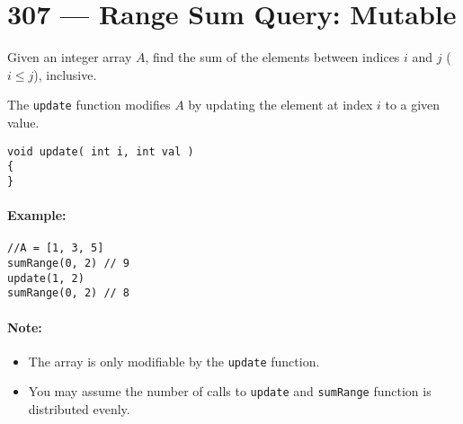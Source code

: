 \section{307 --- Range Sum Query: Mutable}
Given an integer array $A$, find the sum of the elements between indices $i$ and $j$ ($i \leq j$), inclusive.
\par
The \texttt{update} function modifies $A$ by updating the element at index $i$ to a given value.
\begin{lstlisting}[style=customc]
void update( int i, int val )
{
}
\end{lstlisting}

\paragraph{Example:}

\begin{lstlisting}[style=customc]
//A = [1, 3, 5]
sumRange(0, 2) // 9
update(1, 2)
sumRange(0, 2) // 8
\end{lstlisting}

\paragraph{Note:}

\begin{itemize}
\item The array is only modifiable by the \texttt{update} function.
\item You may assume the number of calls to \texttt{update} and \texttt{sumRange} function is distributed evenly.
\end{itemize}

